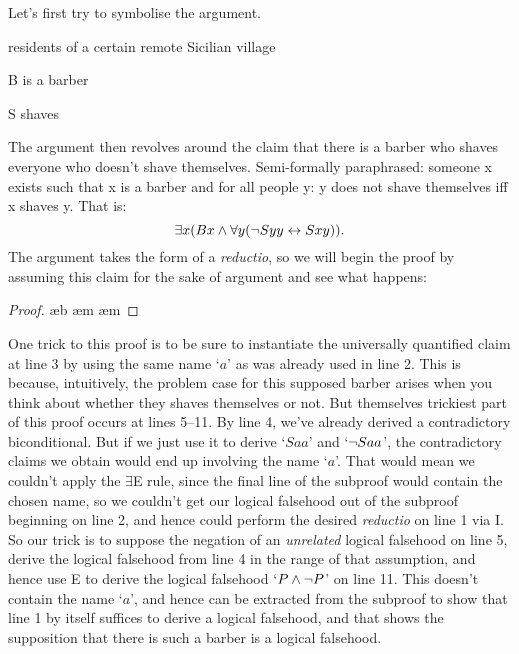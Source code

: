 Let's first try to symbolise the argument. \begin{ekey}
	\item[\text{Domain}] residents of a certain remote Sicilian village
	\item[B] is a barber
	\item[S] shaves 
\end{ekey}
The argument then revolves around the claim that there is a barber who shaves everyone who doesn't shave themselves. Semi-formally paraphrased: someone x exists such that x is a barber and for all people y: y does not shave themselves iff x shaves y. That is: $$\exists x (Bx \wedge \forall y (\neg Syy \leftrightarrow Sxy)).$$ The argument takes the form of a \emph{reductio}, so we will begin the proof by assuming this claim for the sake of argument and see what happens: \begin{proof}
	\open
	\open
	\ae{b}
	\open
		\open 
		\close
		\close
	\close
	\ae{m}
	\ae{m}
	\close
\end{proof}
One trick to this proof is to be sure to instantiate the universally quantified claim at line 3 by using the same name `$a$' as was already used in line 2. This is because, intuitively, the problem case for this supposed barber arises when you think about whether they shaves themselves or not. But themselves trickiest part of this proof occurs at lines 5–11. By line 4, we've already derived a contradictory biconditional. But if we just use it to derive `$Saa$' and `$\neg Saa$', the contradictory claims we obtain would end up involving the name `$a$'. That would mean we couldn't apply the $\exists$E rule, since the final line of the subproof would contain the chosen name, so we couldn't get our logical falsehood out of the subproof beginning on line 2, and hence could perform the desired \emph{reductio} on line 1 via {\enot}I. So our trick is to suppose the negation of an \emph{unrelated} logical falsehood on line 5, derive the logical falsehood from line 4 in the range of that assumption, and hence use {\enot}E to derive the logical falsehood `$P \wedge \neg P$' on line 11. This doesn't contain the name `$a$', and hence can be extracted from the subproof to show that line 1 by itself suffices to derive a logical falsehood, and that shows the supposition that there is such a barber is a logical falsehood.


